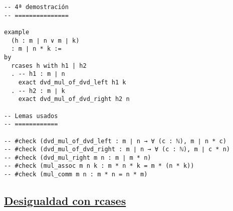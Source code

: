 \begin{verbatim}
-- 4ª demostración
-- ===============

example
  (h : m ∣ n ∨ m ∣ k)
  : m ∣ n * k :=
by
  rcases h with h1 | h2
  . -- h1 : m ∣ n
    exact dvd_mul_of_dvd_left h1 k
  . -- h2 : m ∣ k
    exact dvd_mul_of_dvd_right h2 n

-- Lemas usados
-- ============

-- #check (dvd_mul_of_dvd_left : m ∣ n → ∀ (c : ℕ), m ∣ n * c)
-- #check (dvd_mul_of_dvd_right : m ∣ n → ∀ (c : ℕ), m ∣ c * n)
-- #check (dvd_mul_right m n : m ∣ m * n)
-- #check (mul_assoc m n k : m * n * k = m * (n * k))
-- #check (mul_comm m n : m * n = n * m)
\end{verbatim}

\subsection{\href{./src/Logica/Desigualdad\_con\_rcases.lean}{Desigualdad con rcases}}
\label{sec:org3a45e87}
